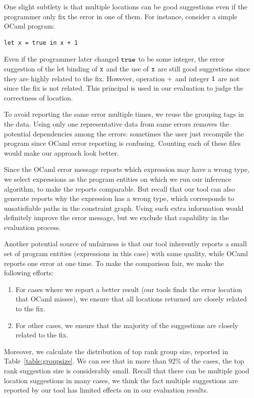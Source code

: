 One slight subtlety is that multiple locations can be good suggestions
even if the programmer only fix the error in one of them. For
instance, consider a simple OCaml program:
\begin{lstlisting}
let x = true in x + 1
\end{lstlisting}

Even if the programmer later changed $\mathtt{true}$ to be some integer,
the error suggestion of the let binding of $\mathtt{x}$ and the use of
$\mathtt{x}$ are still good suggestions since they are highly related to
the fix. However, operation $\mathtt{+}$ and integer $\mathtt{1}$ are not
since the fix is not related. This principal is used in our evaluation
to judge the correctness of location.

To avoid reporting the same error multiple times, we reuse the
grouping tags in the data. Using only one representative data from
same errors removes the potential dependencies among the errors:
sometimes the user just recompile the program since OCaml error
reporting is confusing. Counting each of these files would make our
approach look better.

Since the OCaml error message reports which expression may have a wrong
type, we select expressions as the program entities on which we run our
inference algorithm, to make the reports comparable. But recall that
our tool can also generate reports why the expression has a wrong
type, which corresponds to unsatisfiable paths in the constraint
graph. Using such extra information would definitely improve the error
message, but we exclude that capability in the evaluation process.

Another potential source of unfairness is that our tool inherently
reports a small set of program entities (expressions in this case)
with same quality, while OCaml reports one error at one time. To make
the comparison fair, we make the following efforts:
\begin{enumerate}
\item For cases where we report a better result (our tools finds the
error location that OCaml misses), we ensure that all locations
returned are closely related to the fix.

\item For other cases, we ensure that the majority of the suggestions
are closely related to the fix. 
\end{enumerate}

Moreover, we calculate the distribution of top rank group size,
reported in Table~\ref{table:groupsize}. We can see that in more than
$92\%$ of the cases, the top rank suggestion size is considerably
small. Recall that there can be multiple good location suggestions in
many cases, we think the fact multiple suggestions are reported by our
tool has limited effects on in our evaluation results.

